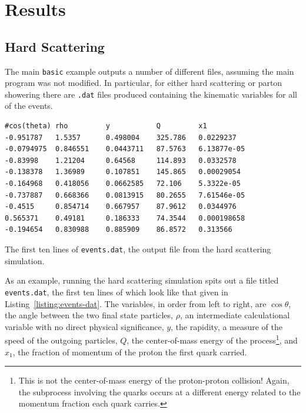 \section{Results}\label{sec:4-results}

\subsection{Hard Scattering}

The main \texttt{basic} example outputs a number of different files, assuming the main program was not modified. In particular, for either hard scattering or parton showering there are \texttt{.dat} files produced containing the kinematic variables for all of the events.

\begin{listing}[!ht]
\begin{verbatim}
#cos(theta) rho         y           Q         x1
-0.951787   1.5357      0.498004    325.786   0.0229237	
-0.0794975  0.846551    0.0443711   87.5763   6.13877e-05	
-0.83998    1.21204     0.64568     114.893   0.0332578	
-0.138378   1.36989     0.107851    145.865   0.00029054	
-0.164968   0.418056    0.0662585   72.106    5.3322e-05	
-0.737887   0.668366    0.0813915   80.2655   7.61546e-05	
-0.4515     0.854714    0.667957    87.9612   0.0344976	
0.565371    0.49181     0.186333    74.3544   0.000198658	
-0.194654   0.830988    0.885909    86.8572   0.313566	
\end{verbatim}
\caption{The first ten lines of \texttt{events.dat}, the output file from the hard scattering simulation.}
\label{listing:events-dat}
\end{listing}

As an example, running the hard scattering simulation spits out a file titled \texttt{events.dat}, the first ten lines of which look like that given in Listing~\ref{listing:events-dat}. The variables, in order from left to right, are $\cos\theta$, the angle between the two final state particles, $\rho$, an intermediate calculational variable with no direct physical significance, $y$, the rapidity, a measure of the speed of the outgoing particles, $Q$, the center-of-mass energy of the process\footnote{This is not the center-of-mass energy of the proton-proton collision! Again, the subprocess involving the quarks occurs at a different energy related to the momentum fraction each quark carries.}, and $x_1$, the fraction of momentum of the proton the first quark carried.

